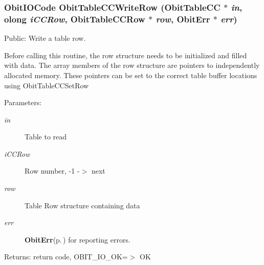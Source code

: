 \subsubsection{\setlength{\rightskip}{0pt plus 5cm}Obit\-IOCode Obit\-Table\-CCWrite\-Row ({\bf Obit\-Table\-CC} $\ast$ {\em in}, {\bf olong} {\em i\-CCRow}, {\bf Obit\-Table\-CCRow} $\ast$ {\em row}, {\bf Obit\-Err} $\ast$ {\em err})}\label{ObitTableCC_8c_a24}


Public: Write a table row. 

Before calling this routine, the row structure needs to be initialized and filled with data. The array members of the row structure are pointers to independently allocated memory. These pointers can be set to the correct table buffer locations using Obit\-Table\-CCSet\-Row \begin{Desc}
\item[Parameters:]
\begin{description}
\item[{\em in}]Table to read \item[{\em i\-CCRow}]Row number, -1 -$>$ next \item[{\em row}]Table Row structure containing data \item[{\em err}]{\bf Obit\-Err}{\rm (p.\,\pageref{structObitErr})} for reporting errors. \end{description}
\end{Desc}
\begin{Desc}
\item[Returns:]return code, OBIT\_\-IO\_\-OK=$>$ OK \end{Desc}
